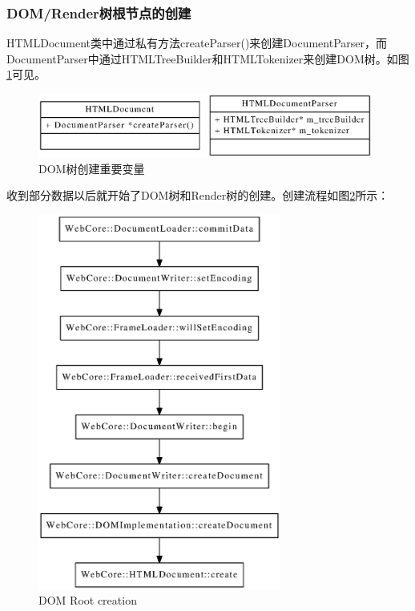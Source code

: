 \subsubsection{DOM/Render树根节点的创建}
HTMLDocument类中通过私有方法createParser()来创建DocumentParser，而DocumentParser中通过HTMLTreeBuilder和HTMLTokenizer来创建DOM树。如图\ref{fig:document_element}可见。
\begin{figure}[ht]
	\begin{center}
		\includegraphics[width=110mm]{image/dom-render-tree.ps}
	\end{center}
	\caption{DOM树创建重要变量}
	\label{fig:document_element}
\end{figure}
收到部分数据以后就开始了DOM树和Render树的创建。创建流程如图\ref{fig:dom_create}所示：
\begin{figure}[ht]
	\begin{center}
		\includegraphics[width=80mm]{image/dom-create.ps}
	\end{center}
	\caption{DOM Root creation}
	\label{fig:dom_create}
\end{figure}

